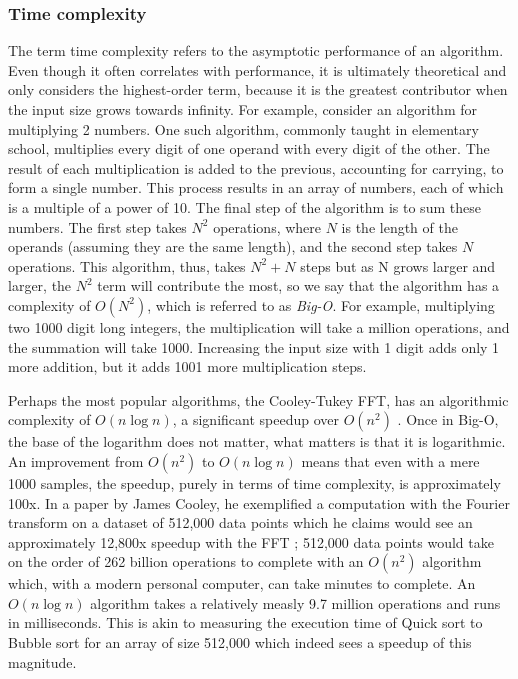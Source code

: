 \subsubsection{Time complexity}
The term time complexity refers to the asymptotic performance of an algorithm. Even though it often correlates with performance, it is ultimately theoretical and only considers the highest-order term, because it is the greatest contributor when the input size grows towards infinity. For example, consider an algorithm for multiplying 2 numbers. One such algorithm, commonly taught in elementary school, multiplies every digit of one operand with every digit of the other. The result of each multiplication is added to the previous, accounting for carrying, to form a single number. This process results in an array of numbers, each of which is a multiple of a power of 10. The final step of the algorithm is to sum these numbers. The first step takes $N^2$ operations, where $N$ is the length of the operands (assuming they are the same length), and the second step takes $N$ operations. This algorithm, thus, takes $N^2+N$ steps but as N grows larger and larger, the $N^2$ term will contribute the most, so we say that the algorithm has a complexity of $O(N^2)$, which is referred to as \textit{Big-O}. For example, multiplying two 1000 digit long integers, the multiplication will take a million operations, and the summation will take 1000. Increasing the input size with 1 digit adds only 1 more addition, but it adds 1001 more multiplication steps.

Perhaps the most popular algorithms, the Cooley-Tukey FFT, has an algorithmic complexity of $O(n \log n)$, a significant speedup over $O(n^2)$ \cite{Randhawa2018} \cite{HeidemanEtAl1984}. Once in Big-O, the base of the logarithm does not matter, what matters is that it is logarithmic. An improvement from $O(n^2)$ to $O(n \log n)$ means that even with a mere 1000 samples, the speedup, purely in terms of time complexity, is approximately 100x. In a paper by James Cooley, he exemplified a computation with the Fourier transform on a dataset of 512,000 data points which he claims would see an approximately 12,800x speedup with the FFT \cite{Cooley1987}; 512,000 data points would take on the order of 262 billion operations to complete with an $O(n^2)$ algorithm which, with a modern personal computer, can take minutes to complete. An $O(n \log n)$ algorithm takes a relatively measly 9.7 million operations and runs in milliseconds. This is akin to measuring the execution time of Quick sort to Bubble sort for an array of size 512,000 which indeed sees a speedup of this magnitude.

